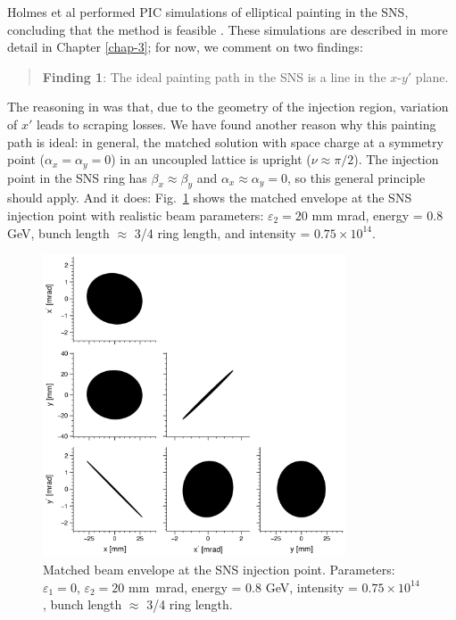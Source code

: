 Holmes et al performed PIC simulations of elliptical painting in the SNS, concluding that the method is feasible \cite{Holmes2018}. These simulations are described in more detail in Chapter \ref{chap-3}; for now, we comment on two findings:
%
\begin{quote}
    \textbf{Finding 1}: The ideal painting path in the SNS is a line in the $x$-$y'$ plane.
\end{quote}
%
The reasoning in \cite{Holmes2018} was that, due to the geometry of the injection region, variation of $x'$ leads to scraping losses. We have found another reason why this painting path is ideal: in general, the matched solution with space charge at a symmetry point ($\alpha_x = \alpha_y = 0$) in an uncoupled lattice is upright ($\nu \approx \pi/2$). The injection point in the SNS ring has $\beta_x \approx \beta_y$ and $\alpha_x \approx \alpha_y = 0$, so this general principle should apply. And it does: Fig.~\ref{fig:matched_env_SNS} shows the matched envelope at the SNS injection point with realistic beam parameters: $\varepsilon_2 = 20$ mm mrad, energy = 0.8 GeV, bunch length $\approx$ 3/4 ring length, and intensity = $0.75 \times 10^{14}$.
%
\begin{figure}[!p]
    \centering
    \includegraphics[width=0.8\textwidth]{Images/chapter2/matched_env_SNS.png}
    \caption{Matched beam envelope at the SNS injection point. Parameters: $\varepsilon_1 = 0$, $\varepsilon_2 = 20$ mm~mrad, energy = 0.8 GeV, intensity = $0.75 \times 10^{14}$, bunch length $\approx$ 3/4 ring length.}
    \label{fig:matched_env_SNS}
\end{figure}
